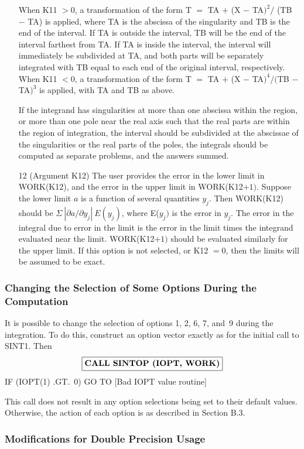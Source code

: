 \documentclass[twoside]{MATH77}
\begin{document}
\begin{itemize}
When K11 $>0$, a transformation of the form T $=$ TA $+$ (X $-$ TA$)^2/$ (TB
$-$ TA) is applied, where TA is the abscissa of the singularity and TB is
the end of the interval. If TA is outside the interval, TB will be the end
of the interval farthest from TA. If TA is inside the interval, the
interval will immediately be subdivided at TA, and both parts will be
separately integrated with TB equal to each end of the original interval,
respectively. When K11 $<0$, a transformation of the form T $=$ TA $+$ (X $-
$ TA$)^4/($TB $-$ TA$)^3$ is applied, with TA and TB as above.

If the integrand has singularities at more than one abscissa within the
region, or more than one pole near the real axis such that the real parts
are within the region of integration, the interval should be subdivided at
the abscissae of the singularities or the real parts of the poles, the
integrals should be computed as separate problems, and the answers summed.

\item[12]  (Argument K12) The user provides the error in the lower limit in
WORK(K12), and the error in the upper limit in WORK(K12$+1)$. Suppose the lower
limit $a$ is a function of several quantities $y_j$. Then WORK(K12) should
be $\Sigma \ |\partial a/\partial y_j|\ E(y_j)$, where E($y_j)$ is the error
in $y_j$. The error in the integral due to error in the limit is the error
in the limit times the integrand evaluated near the limit. WORK(K12$+1)$
should be evaluated similarly for the upper limit. If this option is not
selected, or K12 $=0$, then the limits will be assumed to be exact.
\end{itemize}

\subsubsection{Changing the Selection of Some Options During the Computation%
\label{ChangeSel}}

It is possible to change the selection of options 1, 2, 6, 7, and~9
during the integration. To do this, construct an option vector exactly as
for the initial call to SINT1. Then
$$
\fbox{{\bf CALL SINTOP (IOPT, WORK)}}
$$
IF (IOPT(1) .GT.\ 0) GO TO [Bad IOPT value routine]

This call does not result in any option selections being set to their
default values. Otherwise, the action of each option is as described in
Section B.3.

\subsubsection{Modifications for Double Precision Usage\label{DPuse}}
\end{document}
